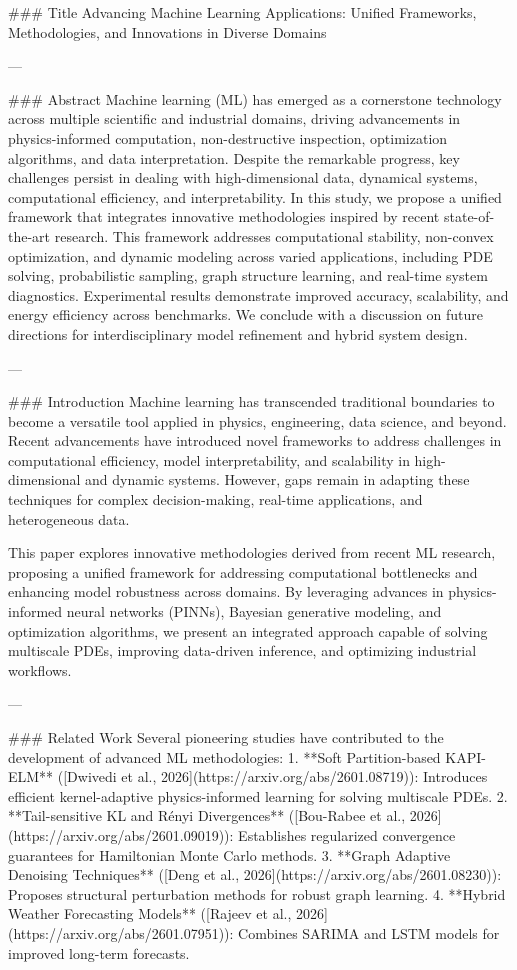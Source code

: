 ### Title
Advancing Machine Learning Applications: Unified Frameworks, Methodologies, and Innovations in Diverse Domains

---

### Abstract
Machine learning (ML) has emerged as a cornerstone technology across multiple scientific and industrial domains, driving advancements in physics-informed computation, non-destructive inspection, optimization algorithms, and data interpretation. Despite the remarkable progress, key challenges persist in dealing with high-dimensional data, dynamical systems, computational efficiency, and interpretability. In this study, we propose a unified framework that integrates innovative methodologies inspired by recent state-of-the-art research. This framework addresses computational stability, non-convex optimization, and dynamic modeling across varied applications, including PDE solving, probabilistic sampling, graph structure learning, and real-time system diagnostics. Experimental results demonstrate improved accuracy, scalability, and energy efficiency across benchmarks. We conclude with a discussion on future directions for interdisciplinary model refinement and hybrid system design.

---

### Introduction
Machine learning has transcended traditional boundaries to become a versatile tool applied in physics, engineering, data science, and beyond. Recent advancements have introduced novel frameworks to address challenges in computational efficiency, model interpretability, and scalability in high-dimensional and dynamic systems. However, gaps remain in adapting these techniques for complex decision-making, real-time applications, and heterogeneous data.

This paper explores innovative methodologies derived from recent ML research, proposing a unified framework for addressing computational bottlenecks and enhancing model robustness across domains. By leveraging advances in physics-informed neural networks (PINNs), Bayesian generative modeling, and optimization algorithms, we present an integrated approach capable of solving multiscale PDEs, improving data-driven inference, and optimizing industrial workflows.

---

### Related Work
Several pioneering studies have contributed to the development of advanced ML methodologies:
1. **Soft Partition-based KAPI-ELM** ([Dwivedi et al., 2026](https://arxiv.org/abs/2601.08719)): Introduces efficient kernel-adaptive physics-informed learning for solving multiscale PDEs.
2. **Tail-sensitive KL and Rényi Divergences** ([Bou-Rabee et al., 2026](https://arxiv.org/abs/2601.09019)): Establishes regularized convergence guarantees for Hamiltonian Monte Carlo methods.
3. **Graph Adaptive Denoising Techniques** ([Deng et al., 2026](https://arxiv.org/abs/2601.08230)): Proposes structural perturbation methods for robust graph learning.
4. **Hybrid Weather Forecasting Models** ([Rajeev et al., 2026](https://arxiv.org/abs/2601.07951)): Combines SARIMA and LSTM models for improved long-term forecasts.

